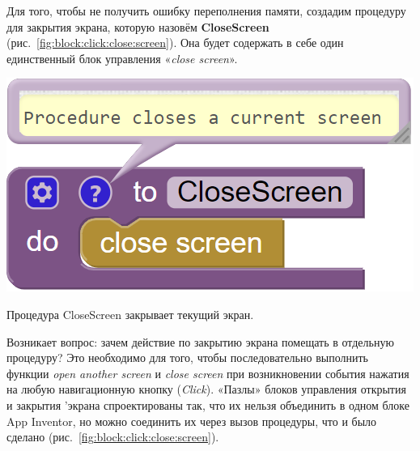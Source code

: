 Для того, чтобы не получить ошибку переполнения памяти, создадим процедуру для закрытия экрана, которую назовём \textbf{CloseScreen} (рис.~\ref{fig:block:click:close:screen}). Она будет содержать в себе один единственный блок управления «\textit{close screen}». 
\begin{marginfigure}[-2em]
  \includegraphics{./graphics/programs/guess_numbers/procedure_closeScreen_AppInventor_2018.png}
    \caption[Процедура CloseScreen.]{Процедура CloseScreen закрывает текущий экран.}
  \label{fig:block:click:close:screen}
\end{marginfigure}
Возникает вопрос: зачем действие по закрытию экрана помещать в отдельную процедуру? Это необходимо для того, чтобы последовательно выполнить функции \textit{open another screen} и \textit{close screen} при возникновении события нажатия на любую навигационную кнопку (\textit{Click}). «Пазлы» блоков управления открытия и закрытия 'экрана спроектированы так, что их нельзя объединить в одном блоке App Inventor, но можно соединить их через вызов процедуры, что и было сделано (рис.~\ref{fig:block:click:close:screen}).

